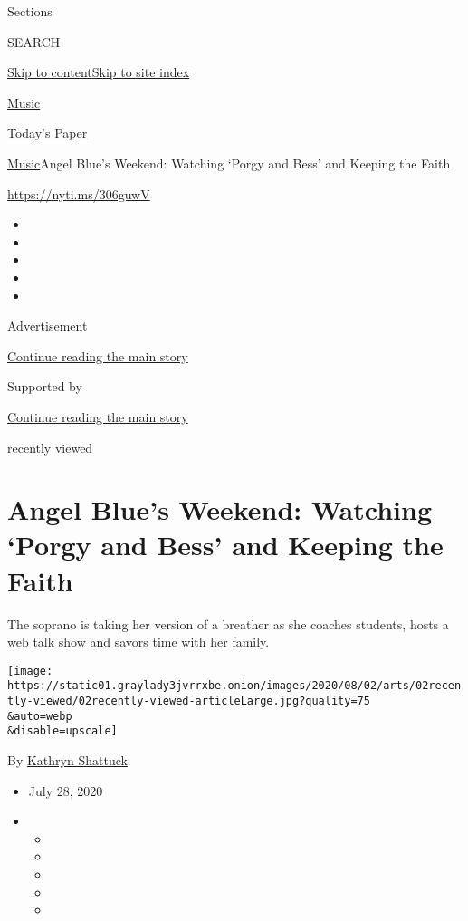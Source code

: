 Sections

SEARCH

\protect\hyperlink{site-content}{Skip to
content}\protect\hyperlink{site-index}{Skip to site index}

\href{https://www.nytimes3xbfgragh.onion/section/arts/music}{Music}

\href{https://myaccount.nytimes3xbfgragh.onion/auth/login?response_type=cookie\&client_id=vi}{}

\href{https://www.nytimes3xbfgragh.onion/section/todayspaper}{Today's
Paper}

\href{/section/arts/music}{Music}\textbar{}Angel Blue's Weekend:
Watching `Porgy and Bess' and Keeping the Faith

\url{https://nyti.ms/306guwV}

\begin{itemize}
\item
\item
\item
\item
\item
\end{itemize}

Advertisement

\protect\hyperlink{after-top}{Continue reading the main story}

Supported by

\protect\hyperlink{after-sponsor}{Continue reading the main story}

recently viewed

\hypertarget{angel-blues-weekend-watching-porgy-and-bess-and-keeping-the-faith}{%
\section{Angel Blue's Weekend: Watching `Porgy and Bess' and Keeping the
Faith}\label{angel-blues-weekend-watching-porgy-and-bess-and-keeping-the-faith}}

The soprano is taking her version of a breather as she coaches students,
hosts a web talk show and savors time with her family.

\texttt{[image: https://static01.graylady3jvrrxbe.onion/images/2020/08/02/arts/02recently-viewed/02recently-viewed-articleLarge.jpg?quality=75\\\&auto=webp\\\&disable=upscale]}

By \href{https://www.nytimes3xbfgragh.onion/by/kathryn-shattuck}{Kathryn
Shattuck}

\begin{itemize}
\item
  July 28, 2020
\item
  \begin{itemize}
  \item
  \item
  \item
  \item
  \item
  \end{itemize}
\end{itemize}


